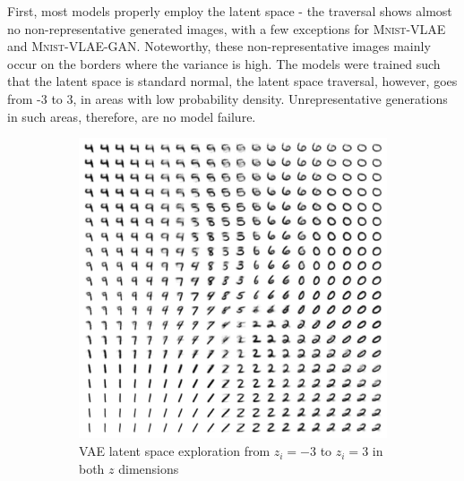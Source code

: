 First, most models properly employ the latent space - the traversal shows almost no non-representative generated images, with a few exceptions for \textsc{Mnist}-\ac{VLAE} and \textsc{Mnist}-\ac{VLAE}-\ac{GAN}.
Noteworthy, these non-representative images mainly occur on the borders where the variance is high.
The models were trained such that the latent space is standard normal, the latent space traversal, however, goes from -3 to 3, in areas with low probability density.
Unrepresentative generations in such areas, therefore, are no model failure.

\begin{figure}
    \centering
    \begin{subfigure}{.45\textwidth}
        \centering
        \includegraphics[width=\textwidth]{images/latent_space_traversals/vae_mnist.png}
        \caption{VAE latent space exploration from $z_i=-3$ to $z_i=3$ in both $z$ dimensions}
    \end{subfigure}
    \hfill
    \begin{subfigure}{.45\textwidth}
        \centering

\end{subfigure}
\end{figure}

